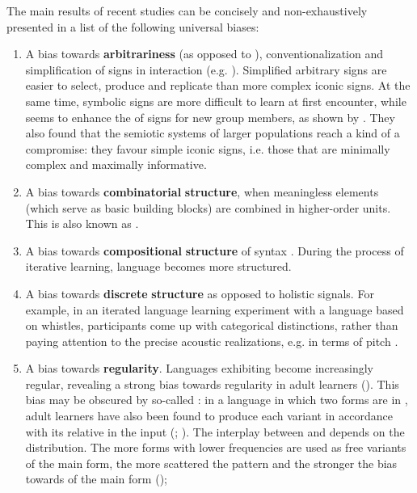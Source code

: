 \documentclass[output=paper]{langsci/langscibook}
\begin{document}
The main results of recent studies can be concisely and non-exhaustively presented in a list of the following universal biases: 

\begin{enumerate}
\item 
A bias towards \textbf{arbitrariness} (as opposed to ), conventionalization and simplification of signs in interaction (e.g. \citealt{CaldwellSmith2012}). Simplified arbitrary signs are easier to select, produce and replicate than more complex iconic signs. At the same time, symbolic signs are more difficult to learn at first encounter, while  seems to enhance the  of signs for new group members, as shown by \citet{FayEllison2013}. They also found that the semiotic systems of larger populations reach a kind of a compromise: they favour simple iconic signs, i.e. those that are minimally complex and maximally informative.
\item 
A bias towards \textbf{combinatorial} \textbf{structure}, when meaningless elements (which serve as basic building blocks) are combined in higher-order units. This is also known as  \citep{Verhoef2012}.
\item 
A bias towards \textbf{compositional} \textbf{structure} of syntax \citep{KirbyEtAl2008}. During the process of iterative learning, language becomes more structured.
\item 
A bias towards \textbf{discrete} \textbf{structure} as opposed to holistic signals. For example, in an iterated language learning experiment with a language based on whistles, participants come up with categorical distinctions, rather than paying attention to the precise acoustic realizations, e.g. in terms of pitch \citep{Verhoef2012}.
\item 
A bias towards \textbf{regularity}. Languages exhibiting  become increasingly regular, revealing a strong bias towards regularity in adult learners (\citealt{SmithWonnacott2010}). This bias may be obscured by so-called : in a language in which two forms are in , adult learners have also been found to produce each variant in accordance with its relative  in the input (\citealt{HudsonKamNewport2009}; \citealt{WonnacottNewport2005}). The interplay between  and  depends on the  distribution. The more forms with lower frequencies are used as free variants of the main form, the more scattered the pattern and the stronger the bias towards  of the main form (\citealt{HudsonKamNewport2009});

\end{enumerate}
\end{document}
